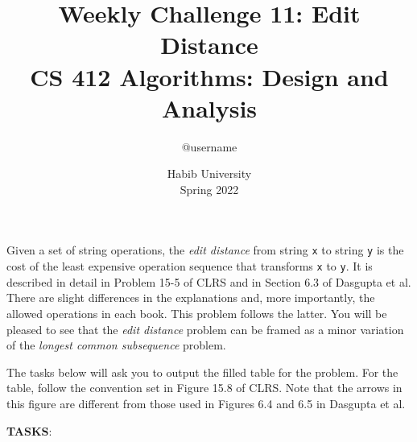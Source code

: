\documentclass[a4paper]{exam}
\title{Weekly Challenge 11: Edit Distance\\CS 412 Algorithms: Design and Analysis}
\author{@username}  %
\date{Habib University\\Spring 2022}
\begin{document}
\maketitle

\begin{questions}
  

  Given a set of string operations, the \textit{edit distance} from string \texttt{x} to string \texttt{y} is the cost of the least expensive operation sequence that transforms \texttt{x} to \texttt{y}. It is described in detail in Problem 15-5 of CLRS and in Section 6.3 of Dasgupta et al. There are slight differences in the explanations and, more importantly, the allowed operations in each book. This problem follows the latter. You will be pleased to see that the \textit{edit distance} problem can be framed as a minor variation of the \textit{longest common subsequence} problem.

  The tasks below will ask you to output the filled table for the problem. For the table, follow the convention set in Figure 15.8 of CLRS. Note that the arrows in this figure are different from those used in Figures 6.4 and 6.5 in Dasgupta et al. 

  \textbf{TASKS}:
 
  \begin{solution}
  \end{solution}
\end{questions}
\end{document}
